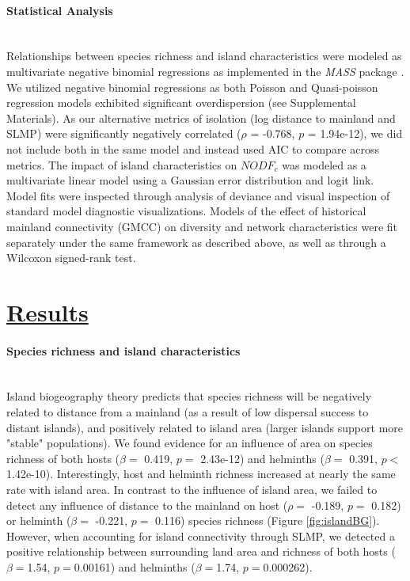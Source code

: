 \paragraph*{Statistical Analysis}\mbox{}\\ 
Relationships between species richness and island characteristics were modeled as multivariate negative binomial regressions as implemented in the \textit{MASS} package \parencite{MASS2002}. We utilized negative binomial regressions as both Poisson and Quasi-poisson regression models exhibited significant overdispersion (see Supplemental Materials). As our alternative metrics of isolation (log distance to mainland and SLMP) were significantly negatively correlated ($\rho$ = -0.768, $p$ = 1.94e-12), we did not include both in the same model and instead used AIC to compare across metrics. The impact of island characteristics on $NODF_c$ was modeled as a multivariate linear model using a Gaussian error distribution and logit link. Model fits were inspected through analysis of deviance and visual inspection of standard model diagnostic visualizations. Models of the effect of historical mainland connectivity (GMCC) on diversity and network characteristics were fit separately under the same framework as described above, as well as through a Wilcoxon signed-rank test. 


\section*{\textbf{\underline{Results}}}

\paragraph*{Species richness and island characteristics}\mbox{}\\ 
Island biogeography theory predicts that species richness will be negatively related to distance from a mainland (as a result of low dispersal success to distant islands), and positively related to island area (larger islands support more "stable" populations). We found evidence for an influence of area on species richness of both hosts ($\beta = $ 0.419, $p =$ 2.43e-12) and helminths ($\beta =$ 0.391, $p <$ 1.42e-10). Interestingly, host and helminth richness increased at nearly the same rate with island area. In contrast to the influence of island area, we failed to detect any influence of distance to the mainland on host ($\rho = $ -0.189, $p =$ 0.182) or helminth ($\beta = $  -0.221, $p =$ 0.116) species richness (Figure \ref{fig:islandBG}). However, when accounting for island connectivity through SLMP, we detected a positive relationship between surrounding land area and richness of both hosts ($\beta=$1.54, $p=$0.00161) and helminths ($\beta=$1.74, $p=$0.000262). 

